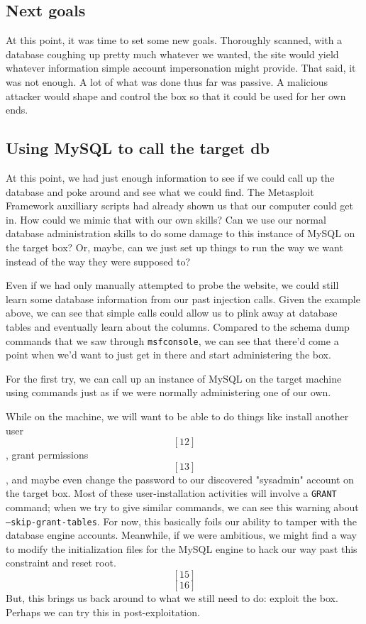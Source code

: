\subsection{Next goals}
At this point, it was time to set some new goals.  Thoroughly scanned, with a database coughing up pretty much whatever we wanted, the site would yield whatever information simple account impersonation might provide.  That said, it was not enough.  A lot of what was done thus far was passive.  A malicious attacker would shape and control the box so that it could be used for her own ends.  

\subsection{Using MySQL to call the target db}
At this point, we had just enough information to see if we could call up the database and poke around and see what we could find.  The Metasploit Framework auxilliary scripts had already shown us that our computer could get in.  How could we mimic that with our own skills?  Can we use our normal database administration skills to do some damage to this instance of MySQL on the target box?  Or, maybe, can we just set up things to run the way we want instead of the way they were supposed to?


Even if we had only manually attempted to probe the website, we could still learn some database information from our past injection calls.  Given the example above, we can see that simple calls could allow us to plink away at database tables and eventually learn about the columns.  Compared to the schema dump commands that we saw through \texttt{msfconsole}, we can see that there'd come a point when we'd want to just get in there and start administering the box.  


For the first try, we can call up an instance of MySQL on the target machine using commands just as if we were normally administering one of our own.  


While on the machine, we will want to be able to do things like install another user \[[12]\], grant permissions \[[13]\], and maybe even change the password to our discovered "sysadmin" account on the target box.  Most of these user-installation activities will involve a \texttt{GRANT} command; when we try to give similar commands, we can see this warning about \texttt{--skip-grant-tables}.  For now, this basically foils our ability to tamper with the database engine accounts.  Meanwhile, if we were ambitious, we might find a way to modify the initialization files for the MySQL engine to hack our way past this constraint and reset root. \[[15]\] \[[16]\]  But, this brings us back around to what we still need to do:  exploit the box.  Perhaps we can try this in post-exploitation.

